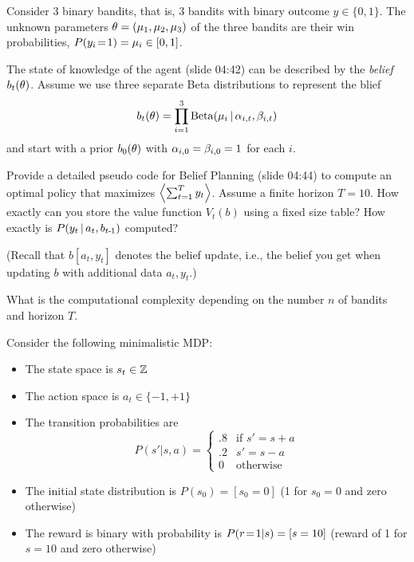 

Consider 3 binary bandits, that is, 3 bandits with binary outcome
$y\in\{0,1\}$. The unknown parameters $\t=(\m_1,\m_2,\m_3)$ of the three
bandits are their win probabilities, $P(y_i \= 1) = \m_i \in [0,1]$.

The state of knowledge of the agent (slide 04:42) can be described
by the \emph{belief} $b_t(\t)$. Assume we use three separate Beta
distributions to represent the blief
$$b_t(\t) = \prod_{i=1}^3 \Beta(\m_i \| \a_{i,t}, \b_{i,t})$$
and start with a prior $b_0(\t)$ with $\a_{i,0}=\b_{i,0}=1$ for each $i$.

Provide a detailed pseudo code for Belief Planning (slide 04:44)
to compute an optimal policy that maximizes $\<\sum_{t=1}^T
y_t\>$. Assume a finite horizon $T=10$. How exactly can you store the
value function $V_t(b)$ using a fixed size table? How exactly is
$P(y_t\|a_t,b_{t\1})$ computed?

(Recall that $b[a_t,y_t]$ denotes the belief update, i.e., the belief
you get when updating $b$ with additional data $a_t,y_t$.)

What is the computational complexity depending on the number $n$ of
bandits and horizon $T$.



Consider the following minimalistic MDP:
\begin{itemize}
\item The state space is $s_t \in \ZZZ$
\item The action space is $a_t \in\{-1, +1\}$
\item The transition probabilities are
$$P(s'|s,a) = \begin{cases} .8
& \text{if~} s'=s+a \\ .2 & s'=s-a \\ 0
& \text{otherwise}\end{cases}$$
\item The initial state distribution is $P(s_0) = [s_0=0]$ (1 for $s_0=0$ and
zero otherwise)
\item The reward is binary with probability is $P(r\=1|s) = [s=10]$
(reward of 1 for $s=10$ and zero otherwise)
\end{itemize}

